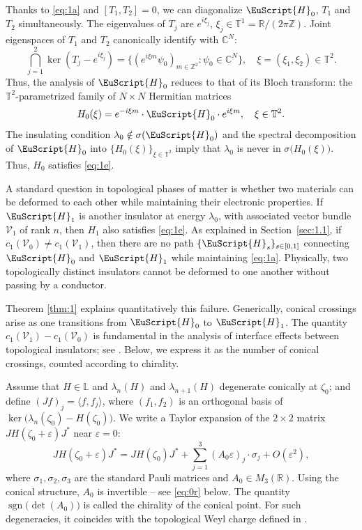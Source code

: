\documentclass[JEP,XML,SOM,Unicode,NoFloatCountersInSection]{cedram}
\let\pazocal\EuScript
\let\sep:
\theoremstyle{definition}
\DeclareMathOperator{\sgn}{sgn}
\newcommand{\HH}{\pazocal{H}}
\newcommand{\VVV}{{\mathscr{V}}}
\newcommand{\C}{\mathbb{C}}
\newcommand{\Ll}{\mathbb{L}}
\newcommand{\R}{\mathbb{R}}
\newcommand{\Z}{\mathbb{Z}}
\newcommand{\Tt}{{\mathbb{T}}}
\let\epsi\varepsilon
\newcommand{\lr}[1]{\langle #1 \rangle}
\begin{document}
Thanks to \eqref{eq:1a} and $[T_1,T_2] = 0$, we can diagonalize $\HH_0$, $T_1$ and $T_2$ simultaneously. The eigenvalues of $T_j$ are $e^{i\xi_j}$, $\xi_j \in \Tt^1 = \R/(2\pi \Z)$. Joint eigenspaces of $T_1$ and $T_2$ canonically identify with $\C^N$:
\begin{equation*}
\bigcap_{j=1}^2 \ker\left(T_j-e^{i\xi_j}\right) = \bigl\{(e^{i\xi m} \psi_0)_{m \in \Z^2} \sep \psi_0 \in \C^N\bigr\} , \quad \xi =(\xi_1,\xi_2) \in \Tt^2.
\end{equation*}
Thus, the analysis of $\HH_0$ reduces to that of its Bloch transform: the $\Tt^2$-parametrized family of $N \times N$ Hermitian matrices
\begin{equation}\label{eq:3b}
H_0(\xi) = e^{-i\xi m} \cdot \HH_0 \cdot e^{i\xi m}, \quad \xi \in \Tt^2.
\end{equation}
The insulating condition $\lambda_0 \notin \sigma(\HH_0)$ and the spectral decomposition of $\HH_0$ into $\{ H_0(\xi) \}_{\xi \in \Tt^2}$ imply that $\lambda_0$ is never in $\sigma\bigl( H_0(\xi) \bigr)$. Thus, $H_0$ satisfies \eqref{eq:1e}.

A standard question in topological phases of matter is whether two materials can be deformed to each other while maintaining their electronic properties. If $\HH_1$ is another insulator at energy $\lambda_0$, with associated vector bundle $\VVV_1$ of rank $n$, then $H_1$ also satisfies \eqref{eq:1e}. As explained in Section~\ref{sec:1.1}, if $c_1(\VVV_0) \neq c_1(\VVV_1)$, then there are no path $\{\HH_s\}_{s \in [0,1]}$ connecting $\HH_0$ and $\HH_1$ while maintaining \eqref{eq:1a}. Physically, two topologically distinct insulators cannot be deformed to one another without passing by a conductor.

Theorem \ref{thm:1} explains quantitatively this failure. Generically, conical crossings arise as one transitions from $\HH_0$ to $\HH_1$. The quantity $c_1(\VVV_1) - c_1(\VVV_0)$ is fundamental in the analysis of interface effects between topological insulators; see \eg \cite{RH08,B19b,D19c}. Below, we express it as the number of conical crossings, counted according to chirality.

Assume that $H \in \Ll$ and $\lambda_n(H)$ and $\lambda_{n+1}(H)$ degenerate conically at $\zeta_0$; and define $(J f)_j = \lr{f, f_j}$, where $(f_1,f_2)$ is an orthogonal basis of $\ker\bigl(\lambda_n(\zeta_0) -H(\zeta_0)\bigr)$. We write a Taylor expansion of the $2 \times 2$ matrix $J H(\zeta_0+\epsi) J^*$ near $\epsi = 0$:
\begin{equation}\label{eq:1g}
J H(\zeta_0+\epsi) J^* = J H(\zeta_0) J^* + \sum_{j=1}^3 (A_0 \epsi)_j \cdot \sigma_j + O(\epsi^2),
\end{equation}
where $\sigma_1, \sigma_2, \sigma_3$ are the standard Pauli matrices and $A_0 \in M_3(\R)$.
Using the conical structure, $A_0$ is invertible -- see \eqref{eq:0r} below. The quantity $\sgn\bigl(\det(A_0) \bigr)$ is called the chirality of the conical point. For such degeneracies, it coincides with the topological Weyl charge defined in \cite{MP14}.
\end{document}
